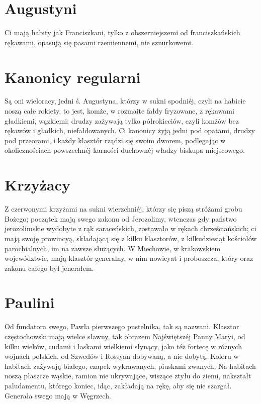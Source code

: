\documentclass{book}
\begin{document}
\section{Augustyni}

Ci mają habity jak Franciszkani, tylko z obszerniejszemi od franciszkańskich rękawami, opasują się pasami rzemiennemi, nie sznurkowemi.

\section{Kanonicy regularni}

Są oni wieloracy, jedni ś. Augustyna, którzy w sukni spodniéj, czyli na habicie noszą całe rokiety, to jest, komże, w rozmaite fałdy fryzowane, z rękawami gładkiemi, wązkiemi; drudzy zażywają tylko półrokieciów, czyli komżów bez rękawów i gładkich, niefałdowanych. Ci kanonicy żyją jedni pod opatami, drudzy pod przeorami, i każdy klasztór rządzi się swoim dworem, podlegając w okolicznościach powszechnéj karności duchownéj władzy biskupa miejscowego.

\section{Krzyżacy}

Z czerwonymi krzyżami na sukni wierzchniéj, którzy się piszą stróżami grobu Bożego; początek mają swego zakonu od Jerozolimy, wtenczas gdy państwo jerozolimskie wydobyte z rąk saraceńskich, zostawało w rękach chrześciańskich; ci mają swoję prowincyą, składającą się z kilku klasztorów, z kilkudziesiąt kościołów parochialnych, im na zawsze służących. W Miechowie, w krakowskiem województwie, mają klasztór generalny, w nim nowicyat i proboszcza, który oraz zakonu całego był jenerałem.

\section{Paulini}

Od fundatora swego, Pawła pierwszego pustelnika, tak są nazwani. Klasztor częstochowski mają wielce sławny, tak obrazem Najświętszéj Panny Maryi, od kilku wieków, cudami i łaskami wielkiemi słynący, jako téż fortecę w różnych wojnach polskich, od Szwedów i Rossyan dobywaną, a nie dobytą. Koloru w habitach zażywają białego, czapek wykrawanych, piuskami zwanych. Na habitach noszą płaszcze wąskie, ramion nie ukrywające, wiszące ztyłu do ziemi, nakształt paludamentu, którego koniec, idąc, zakładają na rękę, aby się nie szargał. Generała swego mają w Węgrzech.
\end{document}
